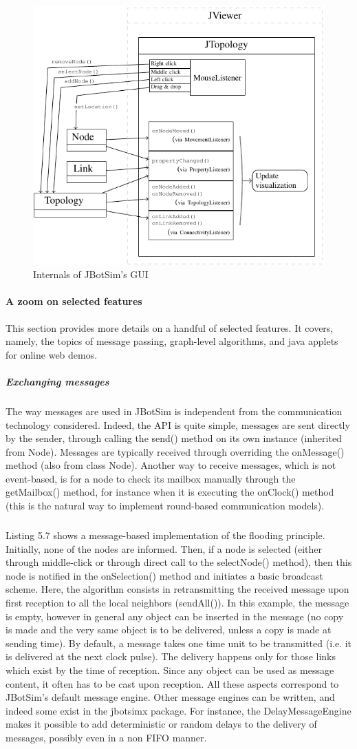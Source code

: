\begin{figure}[h!]
	\centering
	\includegraphics[width=.7\linewidth]{fig_6}
	\caption[Internals of JBotSim’s GUI]{Internals of JBotSim’s GUI}
	\label{fig:fig6}
\end{figure}
\paragraph{A zoom on selected features}This section provides more details on a handful of selected features. It covers, namely, the topics of message passing, graph-level algorithms, and java applets for online web demos.
\subparagraph{Exchanging messages}The way messages are used in JBotSim is independent from the communication technology considered. Indeed, the API is quite simple, messages are sent directly by the sender, through calling the send() method on its own instance (inherited from Node). Messages are typically received through overriding the onMessage() method (also from class Node). Another way to receive messages, which is not event-based, is for a node to check its mailbox manually through the getMailbox() method, for instance when it is executing the onClock() method (this is the natural way to implement round-based communication models). \subparagraph{}Listing 5.7 shows a message-based implementation of the flooding principle. Initially, none of the nodes are informed. Then, if a node is selected (either through middle-click or through direct call to the selectNode() method), then this node is notified in the onSelection() method and initiates a basic broadcast scheme. Here, the algorithm consists in retransmitting the received message upon first reception to all the local neighbors (sendAll()). In this example, the message is empty, however in general any object can be inserted in the message (no copy is made and the very same object is to be delivered, unless a copy is made at sending time). By default, a message takes one time unit to be transmitted (i.e. it is delivered at the next clock pulse). The delivery happens only for those links which exist by the time of reception. Since any object can be used as message content, it often has to be cast upon reception. All these aspects correspond to  JBotSim’s default message engine. Other message engines can be written, and indeed some exist in the jbotsimx package. For instance, the DelayMessageEngine makes it possible to add deterministic or random delays to the delivery of messages, possibly even in a non FIFO manner.
\newpage


